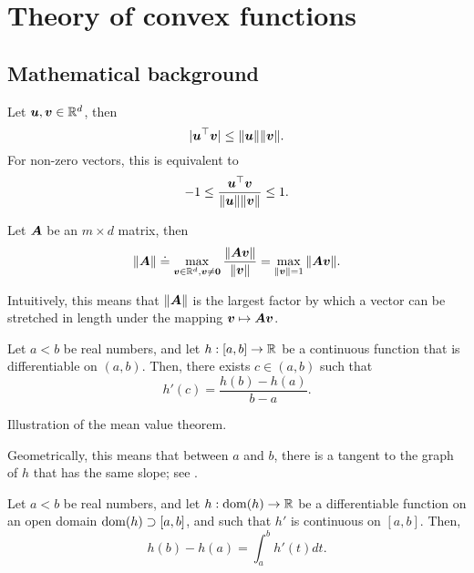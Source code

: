 \section{Theory of convex functions}

\subsection{Mathematical background}

\begin{theorem}
    Let $\bm{u},\bm{v}\in \mathbb{R}^d$, then \[
        |\bm{u}^\top \bm{v}| \leq \|\bm{u}\| \|\bm{v}\|.
    \]
    For non-zero vectors, this is equivalent to \[
        -1 \leq \frac{\bm{u}^\top \bm{v}}{\|\bm{u}\| \|\bm{v}\|} \leq 1.
    \]
\end{theorem}

\begin{definition}
    Let $\bm{A}$ be an $m \times d$ matrix, then \[
        \|\bm{A}\| \doteq \max_{\bm{v}\in \mathbb{R}^d, \bm{v}\neq \bm{0}} \frac{\|\bm{A}\bm{v}\|}{\|\bm{v}\|} = \max_{\|\bm{v}\| = 1} \|\bm{A}\bm{v}\|.
    \]
\end{definition}

Intuitively, this means that $\|\bm{A}\|$ is the largest factor by which a vector can be stretched
in length under the mapping $\bm{v}\mapsto\bm{A}\bm{v}$.

\begin{theorem}
    Let $a<b$ be real numbers, and let $h: [a,b]\to \mathbb{R}$ be a continuous function that is differentiable
    on $(a,b)$. Then, there exists $c\in(a,b)$ such that \[
        h'(c) = \frac{h(b) - h(a)}{b-a}.
    \]
\end{theorem}

\begin{marginfigure}
    \centering
    \caption{Illustration of the mean value theorem.}
    \label{fig:mean-value-theorem}
\end{marginfigure}

Geometrically, this means that between $a$ and $b$, there is a tangent to the graph of $h$ that has
the same slope; see .

\begin{theorem}
    Let $a<b$ be real numbers, and let $h: \mathrm{dom}(h) \to \mathbb{R}$ be a differentiable function on an open domain $\mathrm{dom}(h) \supset [a,b]$, and such that $h'$ is continuous on $[a,b]$. Then, \[
        h(b) - h(a) = \int_a^b h'(t)dt.
    \]
\end{theorem}

